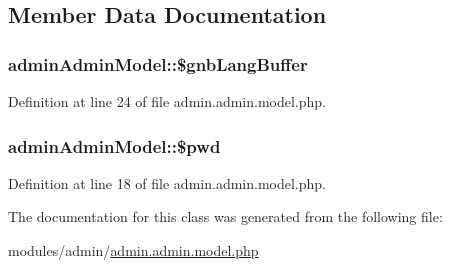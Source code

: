 \subsection{Member Data Documentation}
\hypertarget{classadminAdminModel_acd5e0dd59b6eb5c0df5638247797c799}{
\subsubsection[{\$gnb\-Lang\-Buffer}]{\setlength{\rightskip}{0pt plus 5cm}admin\-Admin\-Model\-::\$gnb\-Lang\-Buffer}}\label{classadminAdminModel_acd5e0dd59b6eb5c0df5638247797c799}


Definition at line 24 of file admin.\-admin.\-model.\-php.

\hypertarget{classadminAdminModel_a0c3f3a9ef22f7f5b6ed159a11d8d8e45}{
\subsubsection[{\$pwd}]{\setlength{\rightskip}{0pt plus 5cm}admin\-Admin\-Model\-::\$pwd}}\label{classadminAdminModel_a0c3f3a9ef22f7f5b6ed159a11d8d8e45}


Definition at line 18 of file admin.\-admin.\-model.\-php.



The documentation for this class was generated from the following file\-:\begin{DoxyCompactItemize}
\item 
modules/admin/\hyperlink{admin_8admin_8model_8php}{admin.\-admin.\-model.\-php}\end{DoxyCompactItemize}
